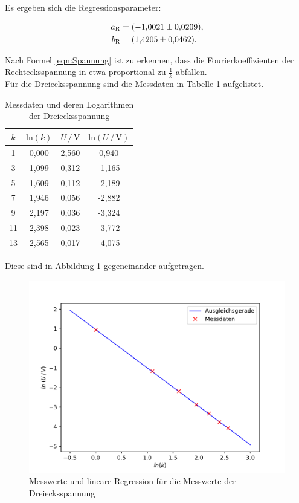 Es ergeben sich die Regressionsparameter:

\begin{align*}
    a_\text{R} &= \SI{-1.0021 \pm 0.0209}{}, \\
    b_\text{R} &= \SI{1.4205 \pm 0.0462}{}.
\end{align*}

Nach Formel \eqref{eqn:Spannung} ist zu erkennen, dass die Fourierkoeffizienten der Rechtecksspannung in etwa
proportional zu $\frac{1}{k}$ abfallen.
\\
\newpage
Für die Dreiecksspannung sind die Messdaten in Tabelle \ref{tab:Messdaten3} aufgelistet.


\begin{table}[H]
    \centering
    \caption{Messdaten und deren Logarithmen der Dreiecksspannung}
    \label{tab:Messdaten3}
    \begin{tabular}{c c c c}
    \toprule
    $k$ & $\text{ln} (k)$ & $U \,/\, \si{\volt}$ & $\text{ln}(U \,/\, \si{\volt})$ \\
    \midrule
     1 & 0,000 & 2,560 &  0,940 \\
     3 & 1,099 & 0,312 & -1,165 \\
     5 & 1,609 & 0,112 & -2,189 \\
     7 & 1,946 & 0,056 & -2,882 \\
     9 & 2,197 & 0,036 & -3,324 \\
    11 & 2,398 & 0,023 & -3,772 \\
    13 & 2,565 & 0,017 & -4,075 \\
    \bottomrule
    \end{tabular}
\end{table} 

Diese sind in Abbildung \ref{fig:Drei} gegeneinander aufgetragen. 

\begin{figure}[H]
    \centering
    \includegraphics[scale=1.0]{content/plot3.pdf}
    \caption{Messwerte und lineare Regression für die Messwerte der Dreiecksspannung}
    \label{fig:Drei}
\end{figure}

